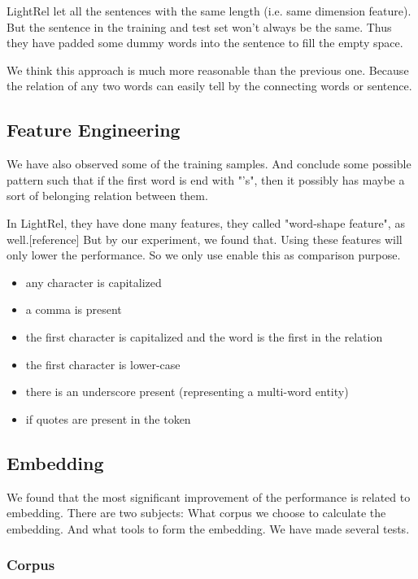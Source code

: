 LightRel let all the sentences with the same length (i.e. same dimension feature). But the sentence in the training and test set won't always be the same. Thus they have padded some dummy words into the sentence to fill the empty space.

We think this approach is much more reasonable than the previous one. Because the relation of any two words can easily tell by the connecting words or sentence.

\subsection{Feature Engineering}
\label{sec:feature_engineering}

We have also observed some of the training samples. And conclude some possible pattern such that if the first word is end with "'s", then it possibly has maybe a sort of belonging relation between them.

In LightRel, they have done many features, they called "word-shape feature", as well.[reference] But by our experiment, we found that. Using these features will only lower the performance. So we only use enable this as comparison purpose.

\begin{itemize}
    \item any character is capitalized
    \item a comma is present
    \item the first character is capitalized and the word is the first in the relation
    \item the first character is lower-case
    \item there is an underscore present (representing a multi-word entity)
    \item if quotes are present in the token
\end{itemize}

\subsection{Embedding}
\label{sec:embedding}

We found that the most significant improvement of the performance is related to embedding. There are two subjects: What corpus we choose to calculate the embedding. And what tools to form the embedding. We have made several tests.

\subsubsection{Corpus}
\label{sec:corpus}

